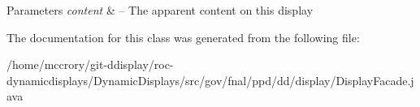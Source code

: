 \begin{DoxyParams}{Parameters}
{\em content} & -- The apparent content on this display \\
\hline
\end{DoxyParams}


The documentation for this class was generated from the following file\-:\begin{DoxyCompactItemize}
\item 
/home/mccrory/git-\/ddisplay/roc-\/dynamicdisplays/\-Dynamic\-Displays/src/gov/fnal/ppd/dd/display/Display\-Facade.\-java\end{DoxyCompactItemize}
